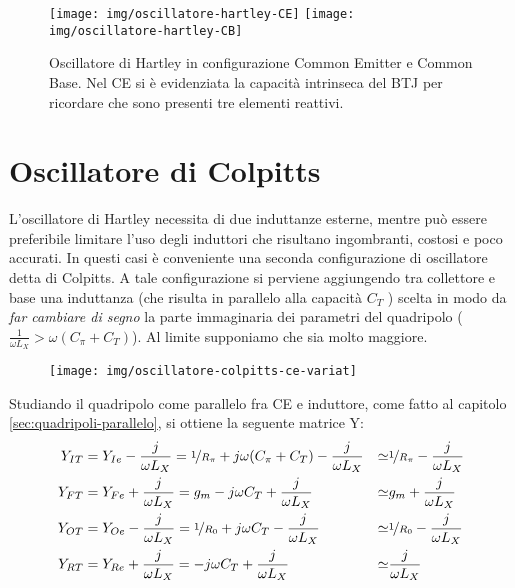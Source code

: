 \begin{figure}[hbt]
	\texttt{[image: img/oscillatore-hartley-CE]}
	\hspace{\fill}
	\texttt{[image: img/oscillatore-hartley-CB]}
	\caption{Oscillatore di Hartley in configurazione Common Emitter e Common Base. Nel CE si è evidenziata la capacità intrinseca del BTJ per ricordare che sono presenti tre elementi reattivi.}
	\label{fig:oscillatore-hartley-ce}
\end{figure}


\section{Oscillatore di Colpitts}

L'oscillatore di Hartley necessita di due induttanze esterne, mentre può essere preferibile limitare l'uso degli induttori che risultano ingombranti, costosi e poco accurati. In questi casi è conveniente una seconda configurazione di oscillatore detta di Colpitts. A tale configurazione si perviene aggiungendo tra collettore e base una induttanza (che risulta in parallelo alla capacità $C_T$ ) scelta in modo da \textit{far cambiare di segno} la parte immaginaria dei parametri del quadripolo ($\frac{1}{\omega L_X} > \omega (C_\pi + C_T)$). Al limite supponiamo che sia molto maggiore.


\begin{figure}[tbh]
	\centering
	\texttt{[image: img/oscillatore-colpitts-ce-variat]}
	\caption{}
	\label{fig:colpitts-ce-analisi}
\end{figure}

Studiando il quadripolo come parallelo fra CE e induttore, come fatto al capitolo \ref{sec:quadripoli-parallelo}, si ottiene la seguente matrice Y:
$$
\begin{aligned}
Y_{IT} & = Y_{Ie} - \frac{j}{\omega L_X} =
\nicefrac{1}{R_\pi} + j \omega (C_\pi + C_T) - \frac{j}{\omega L_X} & \simeq&
\nicefrac{1}{R_\pi} - \frac{j}{\omega L_X}\\
Y_{FT} & = Y_{Fe} + \frac{j}{\omega L_X} =
g_m - j \omega C_T + \frac{j}{\omega L_X} &  \simeq &
g_m + \frac{j}{\omega L_X}
\\
Y_{OT} & = Y_{Oe} - \frac{j}{\omega L_X} =
\nicefrac{1}{R_0} + j \omega C_T - \frac{j}{\omega L_X} & \simeq&
\nicefrac{1}{R_0} - \frac{j}{\omega L_X}
\\
Y_{RT} & = Y_{Re} + \frac{j}{\omega L_X} =
- j \omega C_T + \frac{j}{\omega L_X} & \simeq&
\frac{j}{\omega L_X}
\end{aligned}
$$

